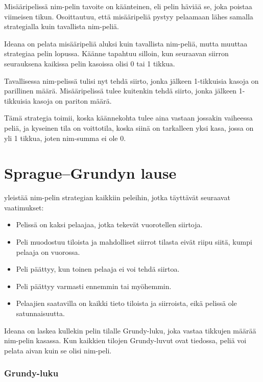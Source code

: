 
Misääripelissä nim-pelin tavoite on käänteinen,
eli pelin häviää se, joka poistaa viimeisen tikun.
Osoittautuu, että misääripeliä pystyy pelaamaan lähes samalla
strategialla kuin tavallista nim-peliä.

Ideana on pelata misääripeliä aluksi kuin tavallista
nim-peliä, mutta muuttaa strategiaa pelin
lopussa. Käänne tapahtuu silloin, kun seuraavan
siirron seurauksena kaikissa pelin kasoissa olisi 0 tai 1 tikkua.

Tavallisessa nim-pelissä tulisi nyt tehdä siirto,
jonka jälkeen 1-tikkuisia kasoja on parillinen määrä.
Misääripelissä tulee kuitenkin tehdä siirto,
jonka jälkeen 1-tikkuisia kasoja on pariton määrä.

Tämä strategia toimii, koska käännekohta tulee aina
vastaan jossakin vaiheessa peliä,
ja kyseinen tila on voittotila,
koska siinä on tarkalleen yksi kasa,
jossa on yli 1 tikkua,
joten nim-summa ei ole 0.

\section{Sprague–Grundyn lause}


 yleistää nim-pelin strategian
kaikkiin peleihin, jotka täyttävät
seuraavat vaatimukset:

\begin{itemize}[noitemsep]
\item Pelissä on kaksi pelaajaa, jotka tekevät vuorotellen siirtoja.
\item Peli muodostuu tiloista ja mahdolliset siirrot tilasta
eivät riipu siitä, kumpi pelaaja on vuorossa.
\item Peli päättyy, kun toinen pelaaja ei voi tehdä siirtoa.
\item Peli päättyy varmasti ennemmin tai myöhemmin.
\item Pelaajien saatavilla on kaikki tieto tiloista
ja siirroista, eikä pelissä ole satunnaisuutta.
\end{itemize}
Ideana on laskea kullekin pelin tilalle Grundy-luku,
joka vastaa tikkujen määrää nim-pelin kasassa.
Kun kaikkien tilojen Grundy-luvut ovat tiedossa,
peliä voi pelata aivan kuin se olisi nim-peli.

\subsubsection{Grundy-luku}


